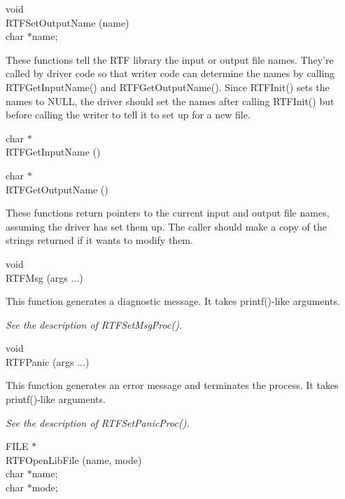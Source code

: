\documentclass{article}
\begin{document}
\noindent
void\\
RTFSetOutputName (name)\\
char	$\ast $name;




\noindent
These functions tell the RTF library the input or output file names. They're 
called by driver code so that writer code can determine the names by calling 
RTFGetInputName() and RTFGetOutputName(). Since RTFInit() sets the names 
to NULL, the driver should set the names after calling RTFInit() but before 
calling the writer to tell it to set up for a new file.




\noindent
char $\ast $\\
RTFGetInputName ()





\noindent
char $\ast $\\
RTFGetOutputName ()




\noindent
These functions return pointers to the current input and output file names, 
assuming the driver has set them up. The caller should make a copy of the 
strings returned if it wants to modify them.




\noindent
void\\
RTFMsg (args ...)




\noindent
This function generates a diagnostic message. It takes printf()-like arguments.



\noindent
{\em See the description of RTFSetMsgProc().



}
\noindent
void\\
RTFPanic (args ...)




\noindent
This function generates an error message and terminates the process. It takes 
printf()-like arguments.



\noindent
{\em See the description of RTFSetPanicProc().



}
\noindent
FILE $\ast $\\
RTFOpenLibFile (name, mode)\\
char	$\ast $name;\\
char	$\ast $mode;
\end{document}
